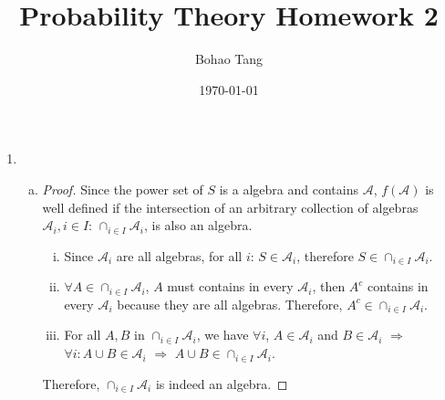 \documentclass[11pt]{article}
\title{Probability Theory Homework 2}
\author{Bohao Tang}
\date{\today}
\begin{document}


\maketitle

\begin{enumerate}[1.]
    \item 
    \begin{enumerate}[(a)]
        \item
        \begin{proof}
        Since the power set of $S$ is a algebra and contains $\mathcal{A}$, 
        $f(\mathcal{A})$ is well defined if the intersection of an arbitrary collection of algebras $\mathcal{A}_i, i \in I$: $\cap_{i \in I}\mathcal{A}_i$, is also an algebra.
        \begin{enumerate}[i.]
           \item
           Since $\mathcal{A}_i$ are all algebras, for all $i$: $S \in \mathcal{A}_i$, therefore $S \in \cap_{i \in I} \mathcal{A}_i$. 
           \item
           $\forall A \in \cap_{i \in I} \mathcal{A}_i$, $A$ must contains in every $\mathcal{A}_i$, then $A^c$ contains in every $\mathcal{A}_i$ because they are all algebras.
           Therefore, $A^c \in \cap_{i \in I} \mathcal{A}_i$. 
           \item
           For all $A, B$ in $\cap_{i \in I} \mathcal{A}_i$, we have $\forall i$, $A \in \mathcal{A}_i$ and $B \in \mathcal{A}_i$ $\Rightarrow$ $\forall i : A \cup B \in \mathcal{A}_i$ $\Rightarrow$ $A \cup B \in \cap_{i \in I} \mathcal{A}_i$.
        \end{enumerate}
        Therefore, $\cap_{i \in I} \mathcal{A}_i$ is indeed an algebra.
        \end{proof} 
        

\end{enumerate}
\end{enumerate}
\end{document}
